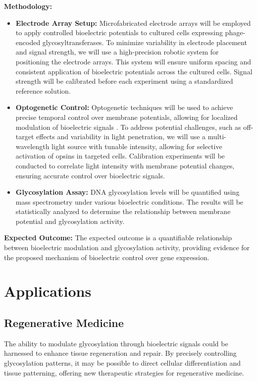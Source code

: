 \documentclass[12pt]{article}
\begin{document}
\textbf{Methodology:}
\begin{itemize}
    \item \textbf{Electrode Array Setup:} Microfabricated electrode arrays will be employed to apply controlled bioelectric potentials to cultured cells expressing phage-encoded glycosyltransferases. To minimize variability in electrode placement and signal strength, we will use a high-precision robotic system for positioning the electrode arrays. This system will ensure uniform spacing and consistent application of bioelectric potentials across the cultured cells. Signal strength will be calibrated before each experiment using a standardized reference solution.
    \item \textbf{Optogenetic Control:} Optogenetic techniques will be used to achieve precise temporal control over membrane potentials, allowing for localized modulation of bioelectric signals \cite{deisseroth2015optogenetics}. To address potential challenges, such as off-target effects and variability in light penetration, we will use a multi-wavelength light source with tunable intensity, allowing for selective activation of opsins in targeted cells. Calibration experiments will be conducted to correlate light intensity with membrane potential changes, ensuring accurate control over bioelectric signals.
    \item \textbf{Glycosylation Assay:} DNA glycosylation levels will be quantified using mass spectrometry under various bioelectric conditions. The results will be statistically analyzed to determine the relationship between membrane potential and glycosylation activity.
\end{itemize}

\textbf{Expected Outcome:} The expected outcome is a quantifiable relationship between bioelectric modulation and glycosylation activity, providing evidence for the proposed mechanism of bioelectric control over gene expression.

\section{Applications}

\subsection{Regenerative Medicine}
The ability to modulate glycosylation through bioelectric signals could be harnessed to enhance tissue regeneration and repair. By precisely controlling glycosylation patterns, it may be possible to direct cellular differentiation and tissue patterning, offering new therapeutic strategies for regenerative medicine.
\end{document}
